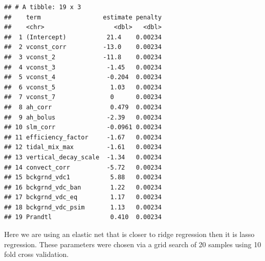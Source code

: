 \documentclass[
  11pt,
]{article}
\newenvironment{Shaded}{\begin{snugshade}}{\end{snugshade}}
\newcommand{\DataTypeTok}[1]{\textcolor[rgb]{0.13,0.29,0.53}{#1}}
\newcommand{\DecValTok}[1]{\textcolor[rgb]{0.00,0.00,0.81}{#1}}
\newcommand{\KeywordTok}[1]{\textcolor[rgb]{0.13,0.29,0.53}{\textbf{#1}}}
\newcommand{\NormalTok}[1]{#1}
\newcommand{\OperatorTok}[1]{\textcolor[rgb]{0.81,0.36,0.00}{\textbf{#1}}}
\newcommand{\StringTok}[1]{\textcolor[rgb]{0.31,0.60,0.02}{#1}}
\begin{document}
\begin{verbatim}
## # A tibble: 19 x 3
##    term                 estimate penalty
##    <chr>                   <dbl>   <dbl>
##  1 (Intercept)           21.4    0.00234
##  2 vconst_corr          -13.0    0.00234
##  3 vconst_2             -11.8    0.00234
##  4 vconst_3              -1.45   0.00234
##  5 vconst_4              -0.204  0.00234
##  6 vconst_5               1.03   0.00234
##  7 vconst_7               0      0.00234
##  8 ah_corr                0.479  0.00234
##  9 ah_bolus              -2.39   0.00234
## 10 slm_corr              -0.0961 0.00234
## 11 efficiency_factor     -1.67   0.00234
## 12 tidal_mix_max         -1.61   0.00234
## 13 vertical_decay_scale  -1.34   0.00234
## 14 convect_corr          -5.72   0.00234
## 15 bckgrnd_vdc1           5.88   0.00234
## 16 bckgrnd_vdc_ban        1.22   0.00234
## 17 bckgrnd_vdc_eq         1.17   0.00234
## 18 bckgrnd_vdc_psim       1.13   0.00234
## 19 Prandtl                0.410  0.00234
\end{verbatim}

\begin{Shaded}
\end{Shaded}

Here we are using an elastic net that is closer to ridge regression then
it is lasso regression. These parameters were chosen via a grid search
of 20 samples using 10 fold cross validation.

\begin{Shaded}
\end{Shaded}
\end{document}
